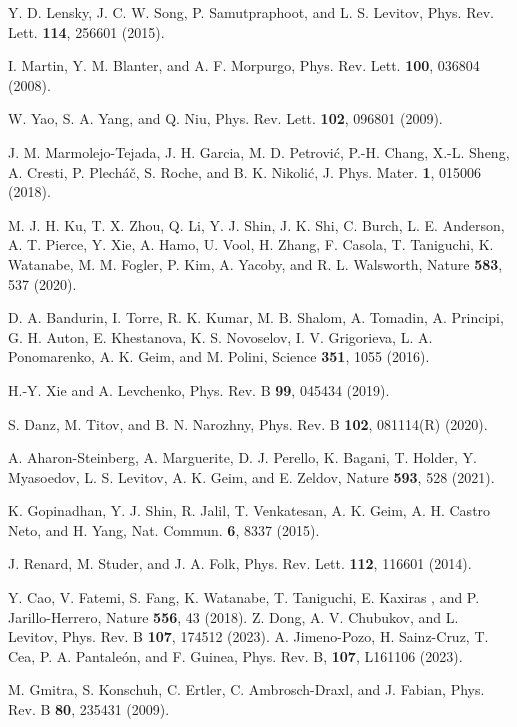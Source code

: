 \documentclass{jpsj3}
\begin{document}
\begin{thebibliography}{99}
 Y. D. Lensky, J. C. W. Song, P. Samutpraphoot, and L. S. Levitov, Phys. Rev. Lett. {\bf 114}, 256601 (2015).



I. Martin, Y. M. Blanter, and A. F. Morpurgo, Phys. Rev. Lett. {\bf 100}, 036804 (2008).


W. Yao, S. A. Yang, and Q. Niu, Phys. Rev. Lett. {\bf 102}, 096801 (2009).


J. M. Marmolejo-Tejada, 
J. H. Garcia, 
M. D. Petrovi\'{c}, 
P.-H. Chang, 
X.-L. Sheng, 
A. Cresti, 
P. Plech\'{a}\v{c}, 
S. Roche, and 
B. K. Nikoli\'{c}, 
J. Phys. Mater. {\bf 1}, 015006 (2018).


 M. J. H. Ku, T. X. Zhou, Q. Li, Y. J. Shin, J. K. Shi, C. Burch, L. E. Anderson, A. T. Pierce, Y. Xie, A. Hamo, U. Vool, H. Zhang, F. Casola, T. Taniguchi, K. Watanabe, M. M. Fogler, P. Kim, A. Yacoby, and R. L. Walsworth, Nature {\bf 583}, 537 (2020).


D. A. Bandurin, I. Torre, R. K. Kumar, M. B. Shalom, A. Tomadin, A. Principi, G. H. Auton, E. Khestanova, K. S. Novoselov, I. V. Grigorieva, L. A. Ponomarenko, A. K. Geim, and M. Polini, Science {\bf 351}, 1055 (2016).


H.-Y. Xie and A. Levchenko, Phys. Rev. B {\bf 99}, 045434 (2019).


S. Danz, M. Titov, and B. N. Narozhny, Phys. Rev. B {\bf 102}, 081114(R) (2020).

 A. Aharon-Steinberg, A. Marguerite, D. J. Perello, K. Bagani, T. Holder, Y. Myasoedov, L. S. Levitov, A. K. Geim, and E. Zeldov, Nature {\bf 593}, 528 (2021).


K. Gopinadhan, Y. J. Shin, R. Jalil, T. Venkatesan, A. K. Geim, A. H. Castro Neto, and H. Yang, Nat. Commun. {\bf 6}, 8337 (2015).

J. Renard, M. Studer, and J. A. Folk, Phys. Rev. Lett. {\bf 112}, 116601 (2014).

Y. Cao, V. Fatemi, S. Fang, K. Watanabe, T. Taniguchi, E. Kaxiras , and P. Jarillo-Herrero, 
Nature {\bf 556}, 43 (2018).
Z. Dong, A. V. Chubukov, and L. Levitov, Phys. Rev. B {\bf 107}, 174512 (2023).
A. Jimeno-Pozo, H. Sainz-Cruz, T. Cea, P. A. Pantale\'{o}n, and F. Guinea, 
Phys. Rev. B, {\bf 107}, L161106 (2023).


M. Gmitra, S. Konschuh, C. Ertler, C. Ambrosch-Draxl, and J. Fabian, Phys. Rev. B {\bf 80}, 235431 (2009).


\end{thebibliography}
\end{document}
